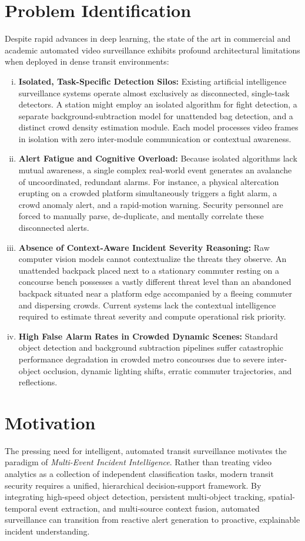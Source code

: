 \documentclass[12pt,a4paper]{report}
\begin{document}
\section{Problem Identification}
Despite rapid advances in deep learning, the state of the art in commercial and academic automated video surveillance exhibits profound architectural limitations when deployed in dense transit environments:
\begin{enumerate}[(i)]
    \item \textbf{Isolated, Task-Specific Detection Silos:} Existing artificial intelligence surveillance systems operate almost exclusively as disconnected, single-task detectors. A station might employ an isolated algorithm for fight detection, a separate background-subtraction model for unattended bag detection, and a distinct crowd density estimation module. Each model processes video frames in isolation with zero inter-module communication or contextual awareness.
    \item \textbf{Alert Fatigue and Cognitive Overload:} Because isolated algorithms lack mutual awareness, a single complex real-world event generates an avalanche of uncoordinated, redundant alarms. For instance, a physical altercation erupting on a crowded platform simultaneously triggers a fight alarm, a crowd anomaly alert, and a rapid-motion warning. Security personnel are forced to manually parse, de-duplicate, and mentally correlate these disconnected alerts.
    \item \textbf{Absence of Context-Aware Incident Severity Reasoning:} Raw computer vision models cannot contextualize the threats they observe. An unattended backpack placed next to a stationary commuter resting on a concourse bench possesses a vastly different threat level than an abandoned backpack situated near a platform edge accompanied by a fleeing commuter and dispersing crowds. Current systems lack the contextual intelligence required to estimate threat severity and compute operational risk priority.
    \item \textbf{High False Alarm Rates in Crowded Dynamic Scenes:} Standard object detection and background subtraction pipelines suffer catastrophic performance degradation in crowded metro concourses due to severe inter-object occlusion, dynamic lighting shifts, erratic commuter trajectories, and reflections.
\end{enumerate}

\section{Motivation}
The pressing need for intelligent, automated transit surveillance motivates the paradigm of \emph{Multi-Event Incident Intelligence}. Rather than treating video analytics as a collection of independent classification tasks, modern transit security requires a unified, hierarchical decision-support framework. By integrating high-speed object detection, persistent multi-object tracking, spatial-temporal event extraction, and multi-source context fusion, automated surveillance can transition from reactive alert generation to proactive, explainable incident understanding.
\end{document}
